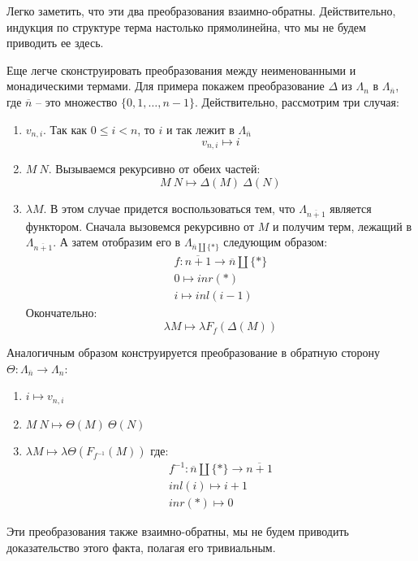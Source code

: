 Легко заметить, что эти два преобразования взаимно-обратны. Действительно, индукция по структуре терма настолько прямолинейна, что мы не будем приводить ее здесь.

Еще легче сконструировать преобразования между неименованными и монадическими термами. Для примера покажем преобразование $\Delta$ из $\Lambda_{n}$ в $\Lambda_{\overline{n}}$, где $\overline{n}$ -- это множество $\{0,1,\dots, n-1\}$. Действительно, рассмотрим три случая:

\begin{enumerate}
  \item $v_{n, i}$. Так как $0 \leqslant i < n$, то $i$ и так лежит в $\Lambda_{\overline{n}}$
  $$ v_{n,i} \mapsto i $$
  \item $M\ N$. Вызываемся рекурсивно от обеих частей:
    $$ M\ N \mapsto \Delta(M)\ \Delta(N) $$
  \item $\lambda M$. В этом случае придется воспользоваться тем, что $\Lambda_{\overline{n+1}}$ является функтором. Сначала вызовемся рекурсивно от $M$ и получим терм, лежащий в $\Lambda_{\overline{n+1}}$. А затем отобразим его в $\Lambda_{\overline{n} \coprod \{*\}}$ следующим образом:
  \begin{gather*}
    f : \overline{n+1} \to \overline{n} \coprod \{*\}\\
    0 \mapsto inr(*) \\
    i \mapsto inl(i-1)
  \end{gather*}
  Окончательно:
  $$ \lambda M \mapsto \lambda F_{f}(\Delta(M))  $$
\end{enumerate}

Аналогичным образом конструируется преобразование в обратную сторону $\Theta : \Lambda_{\overline{n}} \to \Lambda_{n}$:

\begin{enumerate}
  \item $ i \mapsto v_{n, i} $
  \item $ M\ N \mapsto \Theta(M)\ \Theta(N) $
  \item $\lambda M \mapsto \lambda \Theta(F_{f^{-1}}(M))$
  где:
  \begin{gather*}
    f^{-1} : \overline{n} \coprod \{*\} \to \overline{n + 1} \\
    inl(i) \mapsto i + 1 \\
    inr(*) \mapsto 0
  \end{gather*}
\end{enumerate}

Эти преобразования также взаимно-обратны, мы не будем приводить доказательство этого факта, полагая его тривиальным.
